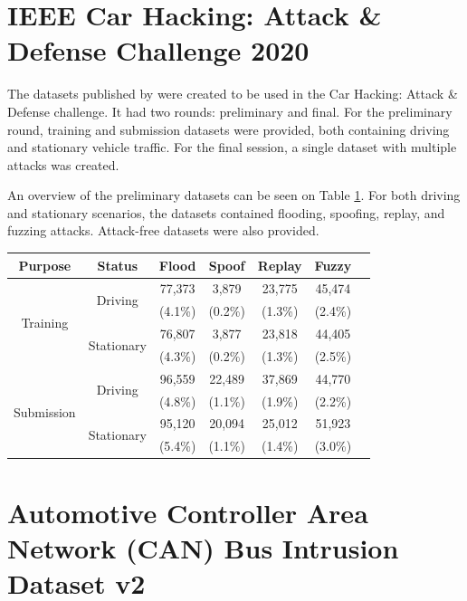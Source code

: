 \section{IEEE Car Hacking: Attack \& Defense Challenge 2020}

The datasets published by \cite{kang2021car} were created to be used in the Car Hacking: Attack \& Defense challenge. It had two rounds: preliminary and final. For the preliminary round, training and submission datasets were provided, both containing driving and stationary vehicle traffic. For the final session, a single dataset with multiple attacks was created.\par
An overview of the preliminary datasets can be seen on Table \ref{tab:ieee_challenge_dataset_overview}. For both driving and stationary scenarios, the datasets contained flooding, spoofing, replay, and fuzzing attacks. Attack-free datasets were also provided.

\begin{table}
    \centering
    \begin{tabular}{*{7}{c}}
        \toprule
        \textbf{Purpose} & \textbf{Status} & \textbf{Flood} & \textbf{Spoof} & \textbf{Replay} & \textbf{Fuzzy}\\
        \midrule
        \multirow{4}{*}{Training} & \multirow{2}{*}{Driving} & 77,373 & 3,879 & 23,775 & 45,474\\
        & & (4.1\%) & (0.2\%) & (1.3\%) & (2.4\%)\\
        & \multirow{2}{*}{Stationary} & 76,807 & 3,877 & 23,818 & 44,405\\
        & & (4.3\%) & (0.2\%) & (1.3\%) & (2.5\%)\\
        \midrule
        \multirow{4}{*}{Submission} & \multirow{2}{*}{Driving} & 96,559 & 22,489 & 37,869 & 44,770\\
        & & (4.8\%) & (1.1\%) & (1.9\%) & (2.2\%)\\
        & \multirow{2}{*}{Stationary} & 95,120 & 20,094 & 25,012 & 51,923 \\
        & & (5.4\%) & (1.1\%) & (1.4\%) & (3.0\%)\\
        \bottomrule
    \end{tabular}
    \label{tab:ieee_challenge_dataset_overview}
\end{table}

\section{Automotive Controller Area Network (CAN) Bus Intrusion Dataset v2}
\label{subsec:tue_dataset}

